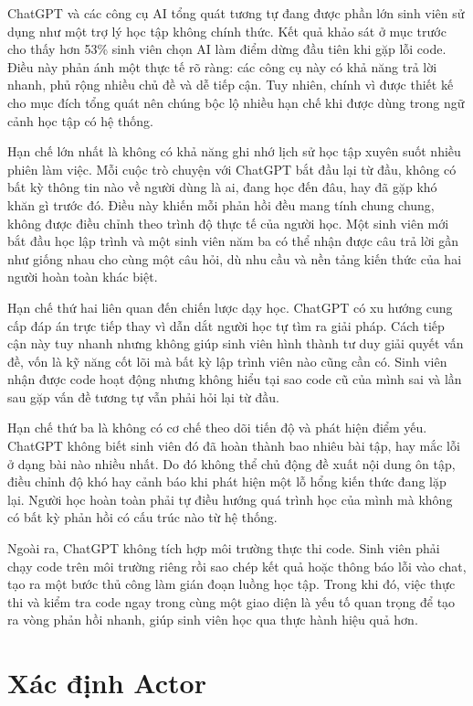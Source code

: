 \documentclass[../main.tex]{subfiles}
\begin{document}
ChatGPT và các công cụ AI tổng quát tương tự đang được phần lớn sinh viên sử dụng như một trợ lý học tập không chính thức. Kết quả khảo sát ở mục trước cho thấy hơn 53\% sinh viên chọn AI làm điểm dừng đầu tiên khi gặp lỗi code. Điều này phản ánh một thực tế rõ ràng: các công cụ này có khả năng trả lời nhanh, phủ rộng nhiều chủ đề và dễ tiếp cận. Tuy nhiên, chính vì được thiết kế cho mục đích tổng quát nên chúng bộc lộ nhiều hạn chế khi được dùng trong ngữ cảnh học tập có hệ thống.

Hạn chế lớn nhất là không có khả năng ghi nhớ lịch sử học tập xuyên suốt nhiều phiên làm việc. Mỗi cuộc trò chuyện với ChatGPT bắt đầu lại từ đầu, không có bất kỳ thông tin nào về người dùng là ai, đang học đến đâu, hay đã gặp khó khăn gì trước đó. Điều này khiến mỗi phản hồi đều mang tính chung chung, không được điều chỉnh theo trình độ thực tế của người học. Một sinh viên mới bắt đầu học lập trình và một sinh viên năm ba có thể nhận được câu trả lời gần như giống nhau cho cùng một câu hỏi, dù nhu cầu và nền tảng kiến thức của hai người hoàn toàn khác biệt.

Hạn chế thứ hai liên quan đến chiến lược dạy học. ChatGPT có xu hướng cung cấp đáp án trực tiếp thay vì dẫn dắt người học tự tìm ra giải pháp. Cách tiếp cận này tuy nhanh nhưng không giúp sinh viên hình thành tư duy giải quyết vấn đề, vốn là kỹ năng cốt lõi mà bất kỳ lập trình viên nào cũng cần có. Sinh viên nhận được code hoạt động nhưng không hiểu tại sao code cũ của mình sai và lần sau gặp vấn đề tương tự vẫn phải hỏi lại từ đầu.

Hạn chế thứ ba là không có cơ chế theo dõi tiến độ và phát hiện điểm yếu. ChatGPT không biết sinh viên đó đã hoàn thành bao nhiêu bài tập, hay mắc lỗi ở dạng bài nào nhiều nhất. Do đó không thể chủ động đề xuất nội dung ôn tập, điều chỉnh độ khó hay cảnh báo khi phát hiện một lỗ hổng kiến thức đang lặp lại. Người học hoàn toàn phải tự điều hướng quá trình học của mình mà không có bất kỳ phản hồi có cấu trúc nào từ hệ thống.

Ngoài ra, ChatGPT không tích hợp môi trường thực thi code. Sinh viên phải chạy code trên môi trường riêng rồi sao chép kết quả hoặc thông báo lỗi vào chat, tạo ra một bước thủ công làm gián đoạn luồng học tập. Trong khi đó, việc thực thi và kiểm tra code ngay trong cùng một giao diện là yếu tố quan trọng để tạo ra vòng phản hồi nhanh, giúp sinh viên học qua thực hành hiệu quả hơn.

\section{Xác định Actor}
\end{document}
